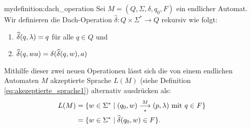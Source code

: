 \begin{mydefinition}{mydefinition:dach_operation}
Sei $M = (Q,\Sigma, \delta, q_0, F)$ ein endlicher Automat. Wir definieren die Dach-Operation $\widehat{\delta}: Q\times \Sigma^* \to Q$ rekursiv wie folgt:
\begin{enumerate}[label=(\roman*)]
	\item $\widehat{\delta}(q,\lambda) = q$ für alle $q\in Q$ und\\
	\item $\widehat{\delta}(q,wa) = \delta (\widehat{\delta}(q,w),a)$\\
\end{enumerate}
\end{mydefinition}
Mithilfe dieser zwei neuen Operationen lässt sich die von einem endlichen Automaten $M$ akzeptierte Sprache $L(M)$ (siehe Definition \cref{eq:akezeptierte_sprache1}) alternativ ausdrücken als:
\begin{equation*}
	\begin{split}
		L(M) & = \{ w\in\Sigma^* \;|\; (q_0,w) \underset{*}{\overset{M}{\longrightarrow}} (p,\lambda) \text{ mit } q\in F\} \\
		     & = \{ w\in\Sigma^* \;|\; \widehat{\delta}(q_0,w)\in F\}.
	\end{split}
\end{equation*}

